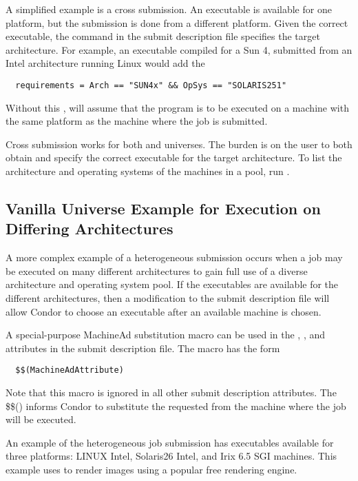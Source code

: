 A simplified example is a cross submission.
An executable is available for one platform, but
the submission is done from a different platform.
Given the correct executable, the  command in
the submit description file specifies the target architecture.
For example, an executable compiled for a Sun 4, submitted
from an Intel architecture running Linux would add the 
\begin{verbatim}
  requirements = Arch == "SUN4x" && OpSys == "SOLARIS251"
\end{verbatim}
Without this , 
will assume that the program is to be executed on
a machine with the same platform as the machine where the job
is submitted.

Cross submission works for both
 and  universes.
The burden is on the user to both obtain and specify
the correct executable for the target architecture.
To list the architecture and operating systems of the machines
in a pool, run .

\subsection{Vanilla Universe Example for Execution on Differing Architectures} 

A more complex example of a heterogeneous submission
occurs when a job may be executed on
many different architectures to gain full
use of a diverse architecture and operating system pool.
If the executables are available for the different architectures,
then a modification to the submit description file
will allow Condor to choose an executable after an
available machine is chosen.

A special-purpose MachineAd substitution macro can be used in
the , ,  and 
attributes in the submit description file.
The macro has the form
\begin{verbatim}
  $$(MachineAdAttribute)
\end{verbatim}
Note that this macro is ignored in all other submit description attributes.
The \$\$() informs Condor to substitute the requested 
from the machine where the job will be executed.

An example of the heterogeneous job submission
has executables available for three platforms:
LINUX Intel, Solaris26 Intel, and Irix 6.5 SGI machines.
This example uses 
to render images using a popular free rendering engine.

